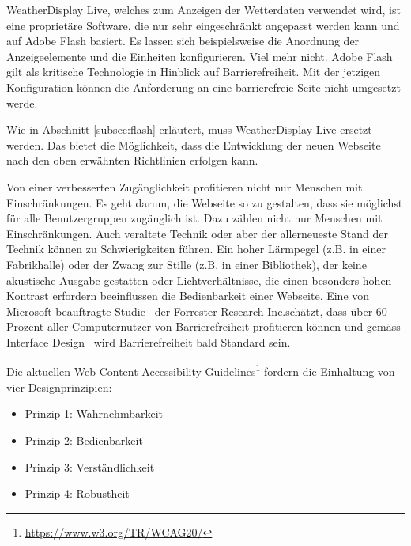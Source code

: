 \noindent
WeatherDisplay Live, welches zum Anzeigen der Wetterdaten verwendet wird, ist eine proprietäre Software, die nur sehr eingeschränkt angepasst werden kann und auf Adobe Flash basiert. Es lassen sich beispielsweise die Anordnung der Anzeigeelemente und die Einheiten konfigurieren. Viel mehr nicht.  Adobe Flash gilt als kritische Technologie in Hinblick auf Barrierefreiheit. Mit der jetzigen Konfiguration können die Anforderung an eine barrierefreie Seite nicht umgesetzt werde.
\newline

\noindent
Wie in Abschnitt \ref{subsec:flash} erläutert, muss WeatherDisplay Live ersetzt werden. Das bietet die Möglichkeit, dass die Entwicklung der neuen Webseite nach den oben erwähnten Richtlinien erfolgen kann.




Von einer verbesserten Zugänglichkeit profitieren nicht nur Menschen mit Einschränkungen. Es geht darum, die Webseite so zu gestalten, dass sie möglichst für alle Benutzergruppen zugänglich ist. Dazu zählen nicht nur Menschen mit Einschränkungen. Auch veraltete Technik oder aber der allerneueste Stand der Technik können zu Schwierigkeiten führen. Ein hoher Lärmpegel (z.B. in einer Fabrikhalle) oder der Zwang zur Stille (z.B. in einer Bibliothek), der keine akustische Ausgabe gestatten oder Lichtverhältnisse, die einen besonders hohen Kontrast erfordern beeinflussen die Bedienbarkeit einer Webseite. Eine von Microsoft beauftragte Studie~\cite{ForresterResearch2004E:Abilities} der \flqq Forrester Research Inc.\frqq schätzt, dass über 60 Prozent aller Computernutzer von Barrierefreiheit profitieren können und gemäss \flqq Interface Design\frqq ~\cite{ThesmannStephan2016ID:U} wird Barrierefreiheit bald Standard sein.

Die aktuellen Web Content Accessibility Guidelines\footnote{ \url{https://www.w3.org/TR/WCAG20/}} fordern die Einhaltung von vier Designprinzipien:

\begin{itemize}
\item Prinzip 1: Wahrnehmbarkeit
\item Prinzip 2: Bedienbarkeit
\item Prinzip 3: Verständlichkeit
\item Prinzip 4: Robustheit
\end{itemize}

